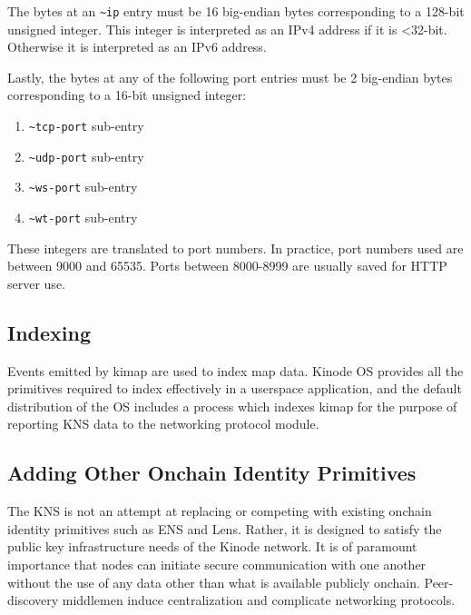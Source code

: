 \documentclass[runningheads]{llncs}
\begin{document}
The bytes at an \verb|~ip| entry must be 16 big-endian bytes corresponding to a 128-bit unsigned integer.
This integer is interpreted as an IPv4 address if it is <32-bit.
Otherwise it is interpreted as an IPv6 address.

Lastly, the bytes at any of the following port entries must be 2 big-endian bytes corresponding to a 16-bit unsigned integer:

\begin{enumerate}
	\item \verb|~tcp-port| sub-entry
	\item \verb|~udp-port| sub-entry
	\item \verb|~ws-port| sub-entry
	\item \verb|~wt-port| sub-entry
\end{enumerate}

These integers are translated to port numbers.
In practice, port numbers used are between 9000 and 65535.
Ports between 8000-8999 are usually saved for HTTP server use.

\subsection{Indexing}
\label{sec:knsindexing}

Events emitted by kimap are used to index map data.
Kinode OS provides all the primitives required to index effectively in a userspace application, and the default distribution of the OS includes a process which indexes kimap for the purpose of reporting KNS data to the networking protocol module.

\subsection{Adding Other Onchain Identity Primitives}
\label{sec:knsotherprimitives}

The KNS is not an attempt at replacing or competing with existing onchain identity primitives such as ENS and Lens.
Rather, it is designed to satisfy the public key infrastructure needs of the Kinode network.
It is of paramount importance that nodes can initiate secure communication with one another without the use of any data other than what is available publicly onchain.
Peer-discovery middlemen induce centralization and complicate networking protocols.
\end{document}
